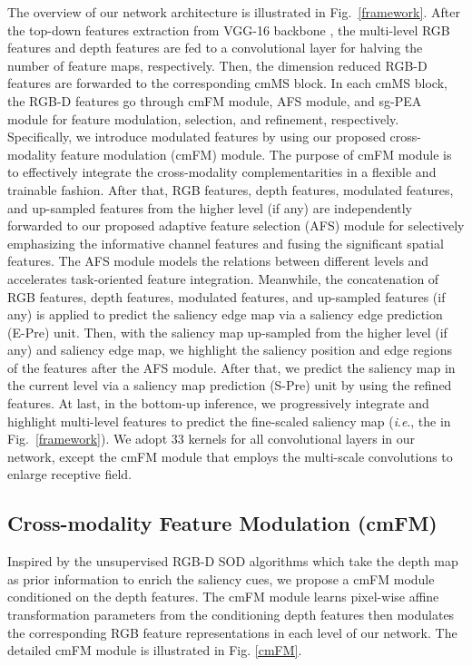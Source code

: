 \documentclass[runningheads]{llncs}
\newcommand{\ie}{\textit{i}.\textit{e}.}
\begin{document}
The overview of our network architecture is illustrated in Fig.~\ref{framework}.
After the top-down features extraction from VGG-16 backbone \cite{VGG},
the multi-level RGB features and depth features are fed to a convolutional layer for halving the number of feature maps, respectively. Then, the dimension reduced RGB-D features are forwarded to the corresponding cmMS block. In each cmMS block, the RGB-D features go through cmFM module, AFS module, and sg-PEA module for feature modulation, selection, and refinement, respectively.
Specifically, we introduce modulated features by using our proposed cross-modality feature modulation (cmFM) module. The purpose of cmFM module is to effectively integrate the cross-modality complementarities in a flexible and trainable fashion.
After that, RGB features, depth features, modulated features, and  up-sampled features from the higher level (if any) are independently forwarded to our proposed adaptive feature selection (AFS) module for selectively emphasizing the informative channel features and fusing the significant spatial features. The AFS module models the relations between different levels and accelerates task-oriented feature integration.
Meanwhile, the concatenation of RGB features, depth features, modulated features, and up-sampled features (if any) is applied to predict the saliency edge map via a saliency edge prediction (E-Pre) unit.
Then, with the saliency map up-sampled from the higher level (if any) and saliency edge map, we highlight the saliency position and edge regions of the features after the AFS module.  After that, we predict the saliency map in the current level via a saliency map prediction (S-Pre) unit by using the refined features.
At last,  in the bottom-up inference, we progressively integrate and highlight multi-level features to predict the fine-scaled saliency map (\ie, the  in Fig.~\ref{framework}).
We adopt 33  kernels for all convolutional layers in our network, except the cmFM module that employs the multi-scale convolutions to enlarge receptive field.



\subsection{Cross-modality Feature Modulation (cmFM)}
Inspired by the unsupervised RGB-D SOD algorithms \cite{DCMC,LBE}  which take the depth map as prior information to enrich the saliency cues, we propose a cmFM module conditioned on the depth features. The cmFM module learns pixel-wise affine transformation parameters from the conditioning depth features then modulates the corresponding RGB feature representations in each level of our network. The detailed cmFM module is illustrated in Fig. \ref{cmFM}.
\end{document}
